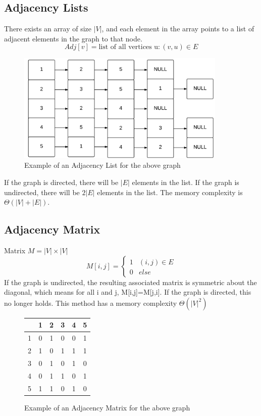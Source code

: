 \documentclass[12pt,letterpaper]{article}
\begin{document}
\subsection{Adjacency Lists}
There exists an array of size $|V|$, and each element in the array points to a list of adjacent elements in the graph to that node. \\
\[Adj[v]=\text{list of all vertices u}:(v,u)\in E\]
\begin{figure}[h]
\centering
\includegraphics[width=10cm]{AdjList}
\caption{Example of an Adjacency List for the above graph}
\end{figure}
If the graph is directed, there will be $|E|$ elements in the list. If the graph is undirected, there will be $2|E|$ elements in the list. The memory complexity is $\Theta(|V|+|E|)$.
\subsection{Adjacency Matrix}
Matrix $M=|V|\times |V|$\\
\[M[i,j]=\begin{cases}1 & (i,j)\in E \\ 0 & else \end{cases}\]
If the graph is undirected, the resulting associated matrix is symmetric about the diagonal, which means for all i and j, M[i,j]=M[j,i]. If the graph is directed, this no longer holds. This method has a memory complexity $\Theta(|V|^2)$
\begin{figure}
\centering
\begin{tabular}{|c|c|c|c|c|c|}
\hline
 &1&2&3&4&5\\ \hline
1&0&1&0&0&1 \\ \hline
2&1&0&1&1&1\\ \hline
3&0&1&0&1&0\\ \hline
4&0&1&1&0&1\\ \hline
5&1&1&0&1&0\\ \hline
\end{tabular}
\caption{Example of an Adjacency Matrix for the above graph}
\end{figure}
\end{document}
